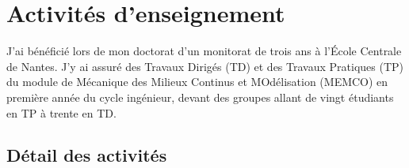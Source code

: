 \section{Activités d'enseignement}

J'ai bénéficié lors de mon doctorat d'un monitorat de trois ans à l'{\'E}cole Centrale de Nantes.
J'y ai assuré des Travaux Dirigés (TD) et des Travaux Pratiques (TP) du module de Mécanique des Milieux Continus et MOdélisation (MEMCO) en première année du cycle ingénieur, devant des groupes allant de vingt étudiants en TP à trente en TD.

\subsection*{Détail des activités}
\label{sec:detail-des-activites}

